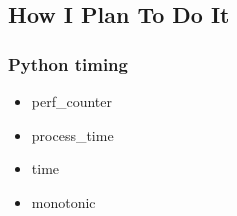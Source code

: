 \subsection{How I Plan To Do It}

\subsubsection{Python timing}

\begin{itemize}
    \item perf\_counter
    \item process\_time
    \item time
    \item monotonic
\end{itemize}